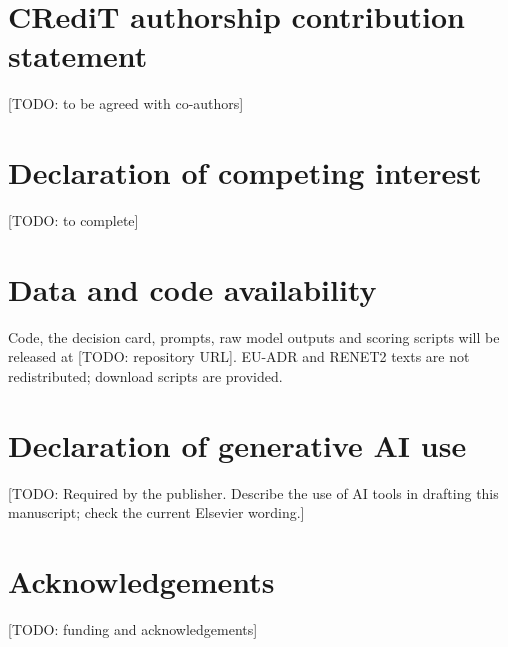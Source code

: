 \documentclass[preprint,10pt,letterpaper]{elsarticle}
\newcommand{\todo}[1]{\textcolor{stneg}{[TODO: #1]}}
\begin{document}
\section*{CRediT authorship contribution statement}
\todo{to be agreed with co-authors}

\section*{Declaration of competing interest}
\todo{to complete}

\section*{Data and code availability}
Code, the decision card, prompts, raw model outputs and scoring scripts will be released at \todo{repository URL}. EU-ADR and RENET2 texts are not redistributed; download scripts are provided.

\section*{Declaration of generative AI use}
\todo{Required by the publisher. Describe the use of AI tools in drafting this manuscript; check the current Elsevier wording.}

\section*{Acknowledgements}
\todo{funding and acknowledgements}



\end{document}
